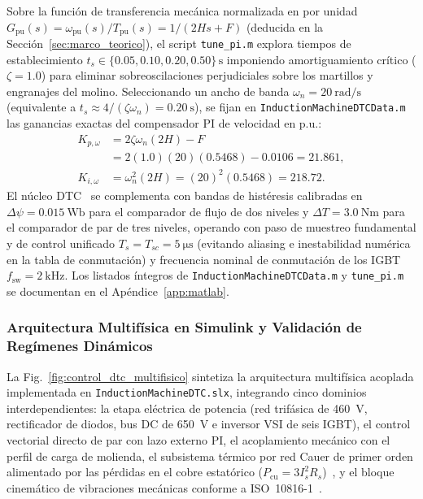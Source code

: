 Sobre la función de transferencia mecánica normalizada en por unidad $G_{\text{pu}}(s) = \omega_{\text{pu}}(s)/T_{\text{pu}}(s) = 1/(2Hs + F)$ (deducida en la Sección~\ref{sec:marco_teorico}), el script \texttt{tune\_pi.m} explora tiempos de establecimiento $t_s \in \{\num{0.05}, \num{0.10}, \num{0.20}, \num{0.50}\}\,\unit{\second}$ imponiendo amortiguamiento crítico ($\zeta=\num{1.0}$) para eliminar sobreoscilaciones perjudiciales sobre los martillos y engranajes del molino. Seleccionando un ancho de banda $\omega_n = \qty{20}{\radian\per\second}$ (equivalente a $t_s \approx 4/(\zeta\omega_n) = \qty{0.20}{\second}$), se fijan en \texttt{Induction\allowbreak Machine\allowbreak DTC\allowbreak Data.m} las ganancias exactas del compensador PI de velocidad en p.u.:
\begin{align}
    K_{p,\omega} &= 2\zeta\omega_n(2H) - F \nonumber\\
                 &= 2(1.0)(20)(0.5468) - 0.0106 = \num{21.861}, \label{eq:kp_pu_calc}\\
    K_{i,\omega} &= \omega_n^2(2H) = (20)^2(0.5468) = \num{218.72}. \label{eq:ki_pu_calc}
\end{align}
El núcleo DTC~\cite{Takahashi1986,Vas1998} se complementa con bandas de histéresis calibradas en $\Delta\psi = \qty{0.015}{\weber}$ para el comparador de flujo de dos niveles y $\Delta T = \qty{3.0}{\newton\meter}$ para el comparador de par de tres niveles, operando con paso de muestreo fundamental y de control unificado $T_s = T_{sc} = \qty{5}{\micro\second}$ (evitando aliasing e inestabilidad numérica en la tabla de conmutación) y frecuencia nominal de conmutación de los IGBT $f_{\text{sw}} = \qty{2}{\kilo\hertz}$. Los listados íntegros de \texttt{Induction\allowbreak Machine\allowbreak DTC\allowbreak Data.m} y \texttt{tune\_pi.m} se documentan en el Apéndice~\ref{app:matlab}.

\subsubsection{Arquitectura Multifísica en Simulink y Validación de Regímenes Dinámicos}
La Fig.~\ref{fig:control_dtc_multifisico} sintetiza la arquitectura multifísica acoplada implementada en \texttt{Induction\allowbreak Machine\allowbreak DTC.slx}, integrando cinco dominios interdependientes: la etapa eléctrica de potencia (red trifásica de \qty{460}{\volt}, rectificador de diodos, bus DC de \qty{650}{\volt} e inversor VSI de seis IGBT), el control vectorial directo de par con lazo externo PI, el acoplamiento mecánico con el perfil de carga de molienda, el subsistema térmico por red Cauer de primer orden alimentado por las pérdidas en el cobre estatórico ($P_{\text{cu}} = 3I_s^2 R_s$)~\cite{Thermal2025}, y el bloque cinemático de vibraciones mecánicas conforme a ISO~10816-1~\cite{ISO10816}.

